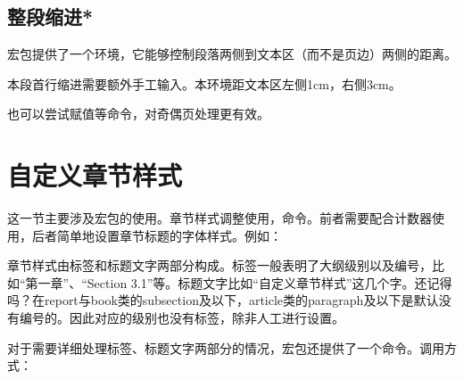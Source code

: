 \subsection{整段缩进*}
宏包提供了一个环境，它能够控制段落两侧到文本区（而不是页边）两侧的距离。
\begin{latex}
\begin{adjustwidth}{1cm}{3cm}
本段首行缩进需要额外手工输入。本环境距文本区左侧1cm，右侧3cm。
\end{adjustwidth}
\end{latex}

也可以尝试赋值等命令，对奇偶页处理更有效。

\section{自定义章节样式}
\label{sec:titlesec}
这一节主要涉及宏包的使用。章节样式调整使用，命令。前者需要配合计数器使用，后者简单地设置章节标题的字体样式。例如：

章节样式由标签和标题文字两部分构成。标签一般表明了大纲级别以及编号，比如“第一章”、“Section 3.1”等。标题文字比如“自定义章节样式”这几个字。还记得吗？在report与book类的subsection及以下，article类的paragraph及以下是默认没有编号的。因此对应的级别也没有标签，除非人工进行设置。

对于需要详细处理标签、标题文字两部分的情况，宏包还提供了一个命令。调用方式：

